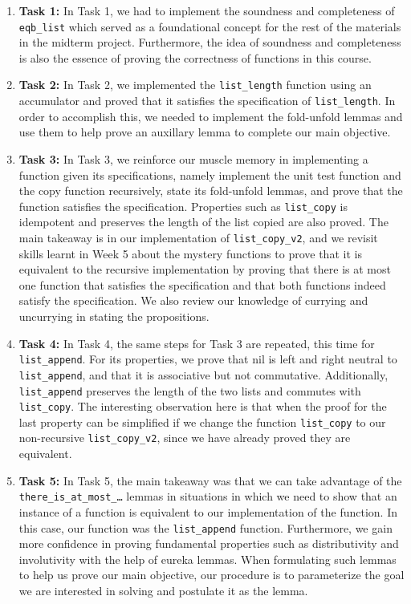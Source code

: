 \documentclass{article}
\begin{document}
\begin{enumerate}
  \item \textbf{Task 1:} In Task 1, we had to implement the soundness and completeness of \texttt{eqb\_list} which served as a foundational concept for the rest of the materials in the midterm project. Furthermore, the idea of soundness and completeness is also the essence of proving the correctness of functions in this course. 
  \item \textbf{Task 2:} In Task 2, we implemented the \texttt{list\_length} function using an accumulator and proved that it satisfies the specification of \texttt{list\_length}. In order to accomplish this, we needed to implement the fold-unfold lemmas and use them to help prove an auxillary lemma to complete our main objective. 
  \item \textbf{Task 3:} In Task 3, we reinforce our muscle memory in implementing a function given its specifications, namely implement the unit test function and the copy function recursively, state its fold-unfold lemmas, and prove that the function satisfies the specification. Properties such as \texttt{list\_copy} is idempotent and preserves the length of the list copied are also proved. The main takeaway is in our implementation of \texttt{list\_copy\_v2}, and we revisit skills learnt in Week 5 about the mystery functions to prove that it is equivalent to the recursive implementation by proving that there is at most one function that satisfies the specification and that both functions indeed satisfy the specification. We also review our knowledge of currying and uncurrying in stating the propositions. 
  \item \textbf{Task 4:} In Task 4, the same steps for Task 3 are repeated, this time for \texttt{list\_append}. For its properties, we prove that nil is left and right neutral to \texttt{list\_append}, and that it is associative but not commutative. Additionally, \texttt{list\_append} preserves the length of the two lists and commutes with \texttt{list\_copy}. The interesting observation here is that when the proof for the last property can be simplified if we change the function \texttt{list\_copy} to our non-recursive \texttt{list\_copy\_v2}, since we have already proved they are equivalent.
  \item \textbf{Task 5:} In Task 5, the main takeaway was that we can take advantage of the \texttt{there\_is\_at\_most\_\ldots} lemmas in situations in which we need to show that an instance of a function is equivalent to our implementation of the function. In this case, our function was the \texttt{list\_append} function. Furthermore, we gain more confidence in proving fundamental properties such as distributivity and involutivity with the help of eureka lemmas. When formulating such lemmas to help us prove our main objective, our procedure is to parameterize the goal we are interested in solving and postulate it as the lemma. 

\end{enumerate}
\end{document}
